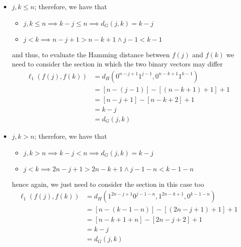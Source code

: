 \documentclass[a4paper, 12pt]{report}
\begin{document}
{        \begin{itemize}
            \item $j, k \le n$; therefore, we have that
                \begin{itemize}
                    \item $j, k \le n \implies k - j \le n \implies d_G(j, k) = k - j$
                    \item $j < k \implies n - j + 1 > n - k + 1 \land j - 1 < k - 1$
                \end{itemize}
                and thus, to evaluate the Hamming distance between $f(j)$ and $f(k)$ we need to consider the  section in which the two binary vectors may differ
                \begin{equation*}
                    \begin{split}
                        \ell_1(f(j), f(k)) &= d_H(0^{n - j + 1}1^{j - 1}, 0^{n - k + 1}1^{k - 1}) \\
                                           &= [n - (j - 1)] - [(n - k + 1) + 1] + 1 \\
                                           &= [n - j + 1] - [n - k + 2] + 1 \\
                                           &= k - j \\
                                           &= d_G(j, k)
                    \end{split}
                \end{equation*}

            \item $j, k > n$; therefore, we have that
                \begin{itemize}
                    \item $j, k > n \implies k - j < n \implies d_G(j, k) = k - j$
                    \item $j < k \implies 2n - j + 1 > 2n - k + 1 \land j - 1 - n < k - 1 - n$
                \end{itemize}
                hence again, we just need to consider the  section in this case too
                \begin{equation*}
                    \begin{split}
                        \ell_1(f(j), f(k)) &= d_H(1^{2n - j + 1}0^{j - 1- n}, 1^{2n - k + 1}, 0^{k - 1- n}) \\
                                           &= [n - (k - 1- n)] - [(2n - j + 1) + 1] + 1 \\
                                           &= [n - k + 1 + n] - [2n - j + 2] + 1 \\
                                           &= k - j \\
                                           &= d_G(j, k)
                    \end{split}
                \end{equation*}


\end{itemize}}
\end{document}

